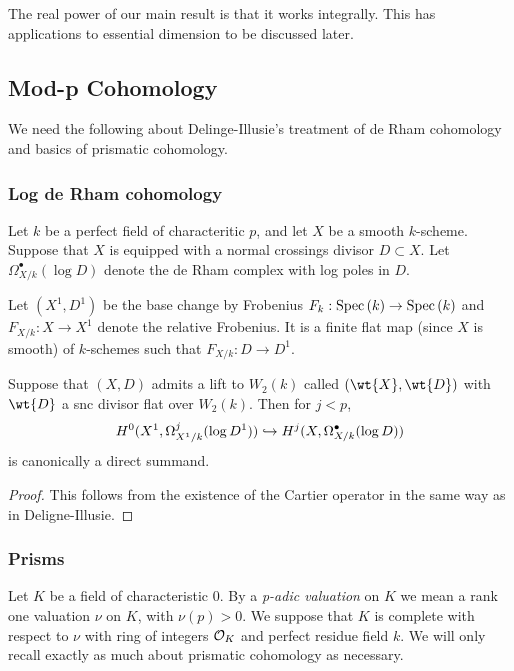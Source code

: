\documentclass[12pt]{article}
\begin{document}
The real power of our main result is that it works integrally. This has applications to essential dimension to be discussed later.

\subsection{Mod-p Cohomology}

We need the following about Delinge-Illusie's treatment of de Rham cohomology and basics of prismatic cohomology.


\subsubsection{Log de Rham cohomology}

Let $k$ be a perfect field of characteritic $p$, and let $X$ be a smooth $k$-scheme. Suppose that $X$ is equipped with a normal crossings divisor $D \subset X$. Let $\Omega^\bullet_{X/k}(\log{D})$ denote the de Rham complex with log poles in $D$. 
\par 
Let $(X^1, D^1)$ be the base change by Frobenius $F_k : \mathrm{Spec}\left( k \right) \to \mathrm{Spec}\left( k \right)$ and $F_{X/k} : X \to X^1$ denote the relative Frobenius. It is a finite flat map (since $X$ is smooth) of $k$-schemes such that $F_{X/k} : D \to D^1$.

\begin{lemma}
Suppose that $(X, D)$ admits a lift to $W_2(k)$ called $(\wt{X}, \wt{D})$ with $\wt{D}$ a snc divisor flat over $W_2(k)$. Then for $j < p$,
\[ H^0(X^1, \Omega^j_{X^1/k}(\log{D^1})) \hookrightarrow H^j(X, \Omega^\bullet_{X/k}(\log{D})) \]
is canonically a direct summand. 
\end{lemma}

\begin{proof}
This follows from the existence of the Cartier operator in the same way as in Deligne-Illusie.
\end{proof}

\subsubsection{Prisms}

Let $K$ be a field of characteristic $0$. By a \textit{p-adic valuation} on $K$ we mean a rank one valuation $\nu$ on $K$, with $\nu(p) > 0$. We suppose that $K$ is complete with respect to $\nu$ with ring of integers $\mathcal{O}_K$ and perfect residue field $k$. We will only recall exactly as much about prismatic cohomology as necessary.
\end{document}
